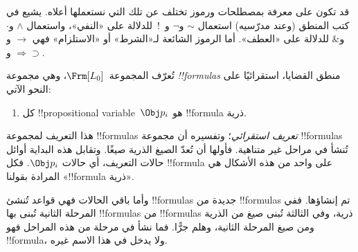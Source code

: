 \documentclass[../../../include/open-logic-section]{subfiles}
\begin{document}
\begin{intro}
قد تكون على معرفة بمصطلحات ورموز تختلف عن تلك التي نستعملها أعلاه. يشيع
في كتب المنطق (وعند مدرّسيه) استعمال $\sim$ و$\neg$ و~!\ للدلالة على
«النفي»، واستعمال $\wedge$ و$\cdot$ و$\&$ للدلالة على «العطف». أما
الرموز الشائعة لـ«الشرط» أو «الاستلزام» فهي $\rightarrow$
و$\Rightarrow$ و$\supset$.
\end{intro}

\begin{defn}[الصيغة]
تُعرّف المجموعة~$\Frm[L_0]$، وهي مجموعة \emph{!!{formula}s} منطق
القضايا، استقرائيًا على النحو الآتي:
\begin{enumerate}


\item كل !!{propositional variable}~$\Obj p_i$ هو !!{formula}
  ذرية.






\end{enumerate}
\end{defn}

\begin{explain}
هذا التعريف لمجموعة !!{formula}s \emph{تعريف استقرائي}؛ وتفسيره أن مجموعة
!!{formula}s تُنشأ في مراحل غير متناهية. فأولها أن تُعدّ الصيغ الذرية صيغًا. وتقابل هذه البداية أوائل حالات التعريف، أي حالات
%
%
$\Obj p_i$. فكل !!{formula} على واحد من هذه الأشكال هي المرادة بقولنا «!!{formula} ذرية».

وأما باقي الحالات فهي قواعد تُنشئ !!{formula}s جديدة من
!!{formula}s تم إنشاؤها. ففي المرحلة الثانية تُبنى بها
!!{formula}s من !!{formula}s ذرية، وفي الثالثة تُبنى صيغ من الذرية ومن صيغ المرحلة الثانية، وهلم جرًّا. فما نشأ في مرحلة من هذه المراحل فهو
!!{formula}، ولا يدخل في هذا الاسم غيره.
\end{explain}
\end{document}

